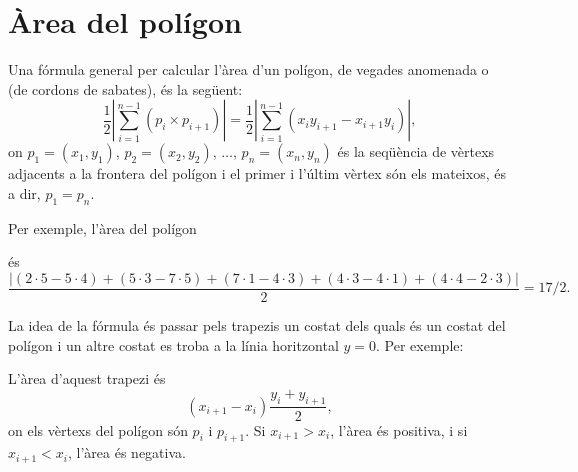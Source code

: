 \section{Àrea del polígon}

Una fórmula general per calcular l'àrea d'un polígon, de vegades
anomenada  o  (de
cordons de sabates), és la següent: 
\[\frac{1}{2} |\sum_{i=1}^ {n-1} (p_i \times p_{i+1})| =
\frac{1}{2} |\sum_{i=1}^{n-1} (x_i y_{i+1} - x_{i+1} y_i)|, \] on $p_1
=(x_1,y_1)$, $p_2=(x_2,y_2)$, $\ldots$, $p_n=(x_n,y_n)$ és la
seqüència de vèrtexs adjacents a la frontera del polígon i el primer i
l'últim vèrtex són els mateixos, és a dir, $p_1=p_n$.

Per exemple, l'àrea del polígon
\begin{center}
\end{center}
és
\[\frac{|(2\cdot5-5\cdot4)+(5\cdot3-7\cdot5)+(7\cdot1-4\cdot3)+(4\cdot3-4\cdot1)+(4\cdot4-2\cdot3)|}{2} = 17/2.\]


La idea de la fórmula és passar pels trapezis un costat dels quals és
un costat del polígon i un altre costat es troba a la línia
horitzontal $y=0$. Per exemple:
\begin{center}
\end{center}
L'àrea d'aquest trapezi és
\[(x_{i+1}-x_{i}) \frac{y_i+y_{i+1}}{2},\]
on els vèrtexs del polígon són $p_i$ i $p_{i+1}$. Si $x_{i+1}>x_{i}$,
l'àrea és positiva, i si $x_{i+1}<x_{i}$, l'àrea és negativa.


